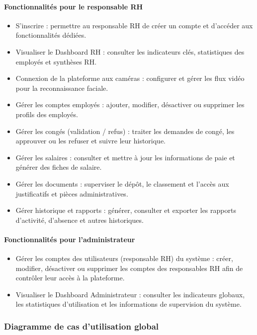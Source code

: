 \paragraph{Fonctionnalités pour le responsable RH}

\begin{itemize}
  \item S'inscrire : permettre au responsable RH de créer un compte et d'accéder aux fonctionnalités dédiées.
  \item Visualiser le Dashboard RH : consulter les indicateurs clés, statistiques des employés et synthèses RH.
  \item Connexion de la plateforme aux caméras : configurer et gérer les flux vidéo pour la reconnaissance faciale.
  \item Gérer les comptes employés : ajouter, modifier, désactiver ou supprimer les profils des employés.
  \item Gérer les congés (validation / refus) : traiter les demandes de congé, les approuver ou les refuser et suivre leur historique.
  \item Gérer les salaires : consulter et mettre à jour les informations de paie et générer des fiches de salaire.
  \item Gérer les documents : superviser le dépôt, le classement et l'accès aux justificatifs et pièces administratives.
  \item Gérer historique et rapports : générer, consulter et exporter les rapports d'activité, d'absence et autres historiques.
\end{itemize}

\paragraph{Fonctionnalités pour l'administrateur}

\begin{itemize}
  \item Gérer les comptes des utilisateurs (responsable RH) du système : créer, modifier, désactiver ou supprimer les comptes des responsables RH afin de contrôler leur accès à la plateforme.
  \item Visualiser le Dashboard Administrateur : consulter les indicateurs globaux, les statistiques d'utilisation et les informations de supervision du système.
  
\end{itemize}

\subsubsection{Diagramme de cas d'utilisation global}



